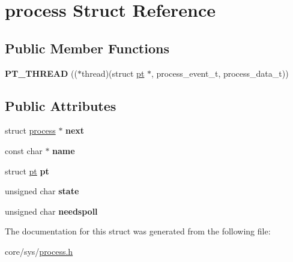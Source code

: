 \hypertarget{structprocess}{\section{process Struct Reference}
\label{structprocess}
}
\subsection*{Public Member Functions}
\begin{DoxyCompactItemize}
\item 
\hypertarget{structprocess_a2fc6f517fc51107c3d7a3f82abbd2777}{{\bfseries P\-T\-\_\-\-T\-H\-R\-E\-A\-D} (($\ast$thread)(struct \hyperlink{structpt}{pt} $\ast$, process\-\_\-event\-\_\-t, process\-\_\-data\-\_\-t))}\label{structprocess_a2fc6f517fc51107c3d7a3f82abbd2777}

\end{DoxyCompactItemize}
\subsection*{Public Attributes}
\begin{DoxyCompactItemize}
\item 
\hypertarget{structprocess_aa714b70ab9ca99fc489de2f70a091b0b}{struct \hyperlink{structprocess}{process} $\ast$ {\bfseries next}}\label{structprocess_aa714b70ab9ca99fc489de2f70a091b0b}

\item 
\hypertarget{structprocess_a78b62efdeb69a53c334a2fe0909c84cd}{const char $\ast$ {\bfseries name}}\label{structprocess_a78b62efdeb69a53c334a2fe0909c84cd}

\item 
\hypertarget{structprocess_a68e0ede15bef73b0a641955fe8cb0edd}{struct \hyperlink{structpt}{pt} {\bfseries pt}}\label{structprocess_a68e0ede15bef73b0a641955fe8cb0edd}

\item 
\hypertarget{structprocess_a481a37ac56e19e2a1e65341b0db2b177}{unsigned char {\bfseries state}}\label{structprocess_a481a37ac56e19e2a1e65341b0db2b177}

\item 
\hypertarget{structprocess_a2b2ad213f87d7a470caf9f350a436f7c}{unsigned char {\bfseries needspoll}}\label{structprocess_a2b2ad213f87d7a470caf9f350a436f7c}

\end{DoxyCompactItemize}


The documentation for this struct was generated from the following file\-:\begin{DoxyCompactItemize}
\item 
core/sys/\hyperlink{process_8h}{process.\-h}\end{DoxyCompactItemize}
